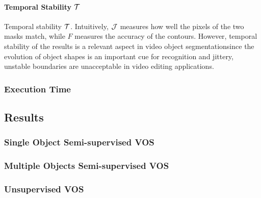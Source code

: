 \paragraph{Temporal Stability $\mathcal{T}$}
Temporal stability $\mathcal{T}$. Intuitively, $\mathcal{J}$ measures how well the pixels of the two masks match, while $F$ measures the
accuracy of the contours. However, temporal stability of the results is a relevant aspect in video object segmentationsince the evolution of object shapes is an important cue for
recognition and jittery, unstable boundaries are unacceptable in video editing applications. 

\subsubsection{Execution Time}

\subsection{Results}


\subsubsection{Single Object Semi-supervised VOS}

\subsubsection{Multiple Objects Semi-supervised VOS}

\subsubsection{Unsupervised VOS}

